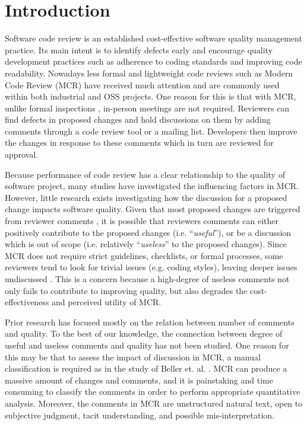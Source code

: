 
\section{Introduction}
Software code review is an established cost-effective software quality management practice.
Its main intent is to  identify  defects early and encourage quality development practices such as adherence to coding standards and improving code readability.
Nowadays less formal and lightweight code reviews such as Modern Code Review (MCR)\cite{Bacchelli2013a} have received much attention and are commonly used within both industrial and OSS projects.
One reason for this is that with MCR, unlike formal inspections \cite{Fagan:1976:DCI:1661010.1661012}, in-person meetings are not required.
Reviewers can find defects in proposed changes and hold discussions on them by adding comments through a code review tool or a mailing list.
Developers then improve the changes in response to these comments which in turn are reviewed for approval.  

Because performance of code review has a clear relationship to the quality of software project, many studies have investigated the influencing factors in MCR\cite{Baysal2001,Mcintosh,Beller,Hamasaki2013}.
However, little research exists investigating how the discussion for a proposed change impacts software quality.
Given that most proposed changes are triggered from reviewer comments \cite{Beller}, 
it is possible that reviewers comments can either positively contribute to the proposed changes (i.e. ``\emph{useful}''), or be a discussion which is out of scope (i.e. relatively  ``\emph{useless}''  to the proposed changes). 
Since MCR does not require strict guidelines, checklists, or formal processes, some reviewers tend to look for trivial issues (e.g. coding styles), leaving deeper issues undiscussed \cite{Bacchelli2013a}. This is a concern because a high-degree of useless comments not only fails to contribute to improving quality, but also degrades the cost-effectiveness and perceived utility of MCR.%

Prior research has focused mostly on the relation between number of comments and quality.
To the best of our knowledge, the connection between degree of useful and useless comments and quality has not been studied.
One reason for this may be that to assess the impact of discussion in MCR, a manual classification is required as in the study of Beller et. al. \cite{Beller}.
MCR can produce a massive amount of changes and comments\cite{Balachandran2013,Thongtanunam2014}, and it is painstaking and time consuming to classify the comments in order to perform appropriate quantitative analysis.
Moreover, the comments in MCR are unstructured natural text, open to subjective judgment, tacit understanding, and possible mis-interpretation. 



